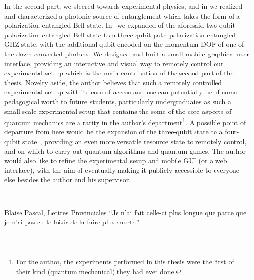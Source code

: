 \bigskip
\noindent
In the second part, we steered towards experimental physics, and in  we realized and characterized a photonic source of entanglement which takes the form of a polarization-entangled Bell state. In~ we expanded of the aforesaid two-qubit polarization-entangled Bell state to a three-qubit path-polarization-entangled \acs{GHZ} state, with the additional qubit encoded on the momentum \acs{DOF} of one of the down-converted photons. We designed and built a small mobile graphical user interface, providing an interactive and visual way to remotely control our experimental set up which is the main contribution of the second part of the thesis. Novelty aside, the author believes that such a remotely controlled experimental set up with its ease of access and use can potentially be of some pedagogical worth to future students, particularly undergraduates as such a small-scale experimental setup that contains the some of the core aspects of quantum mechanics are a rarity in the author's department\footnote{For the author, the experiments performed in this thesis were the first of their kind (quantum mechanical) they had ever done.}. A possible point of departure from here would be the expansion of the three-qubit state to a four-qubit state~\cite{Park_2007}, providing an even more versatile resource state to remotely control, and on which to carry out quantum algorithms and quantum games. The author would also like to refine the experimental setup and mobile GUI (or a web interface), with the aim of eventually making it publicly accessible to everyone else besides the author and his supervisor.

\clearpage
\pagestyle{empty}
\begin{fullwidth}
    ~\vfill
    \begin{center}
        \large
        \begin{minipage}{0.5\linewidth}
            \begin{epigram}{Blaise Pascal, Lettres Provinciales}
                \enquote{Je n’ai fait celle-ci plus longue que parce que je n’ai pas eu le loisir de la faire plus courte.}
            \end{epigram}
        \end{minipage}
    \end{center}
    ~\vfill
\end{fullwidth}
